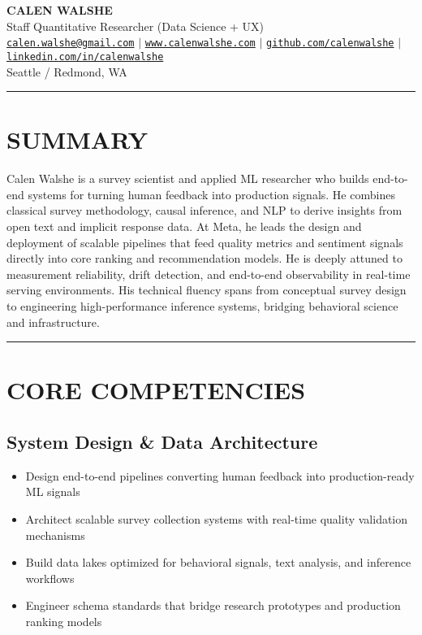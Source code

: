 \documentclass[11pt,a4paper]{article}
\newcommand{\sepline}{\noindent\rule{\textwidth}{0.5pt}\vspace{0.5em}}
\begin{document}
\begin{center}
    {\Huge\bfseries\color{darkblue} CALEN WALSHE}\\[0.3em]
    {\large Staff Quantitative Researcher (Data Science + UX)}\\[0.5em]

    \href{mailto:calen.walshe@gmail.com}{\texttt{calen.walshe@gmail.com}} $\mid$
    \href{https://www.calenwalshe.com}{\texttt{www.calenwalshe.com}} $\mid$
    \href{https://github.com/calenwalshe}{\texttt{github.com/calenwalshe}} $\mid$
    \href{https://linkedin.com/in/calenwalshe}{\texttt{linkedin.com/in/calenwalshe}}\\[0.2em]

    {\color{mediumgray} Seattle / Redmond, WA}
\end{center}

\vspace{0.5em}
\sepline

\section*{SUMMARY}
Calen Walshe is a survey scientist and applied ML researcher who builds end-to-end systems for turning human feedback into production signals. He combines classical survey methodology, causal inference, and NLP to derive insights from open text and implicit response data. At Meta, he leads the design and deployment of scalable pipelines that feed quality metrics and sentiment signals directly into core ranking and recommendation models. He is deeply attuned to measurement reliability, drift detection, and end-to-end observability in real-time serving environments. His technical fluency spans from conceptual survey design to engineering high-performance inference systems, bridging behavioral science and infrastructure.

\vspace{0.5em}
\sepline

\section*{CORE COMPETENCIES}

\subsection*{System Design \& Data Architecture}
\begin{itemize}
    \item Design end-to-end pipelines converting human feedback into production-ready ML signals
    \item Architect scalable survey collection systems with real-time quality validation mechanisms
    \item Build data lakes optimized for behavioral signals, text analysis, and inference workflows
    \item Engineer schema standards that bridge research prototypes and production ranking models
\end{itemize}
\end{document}
